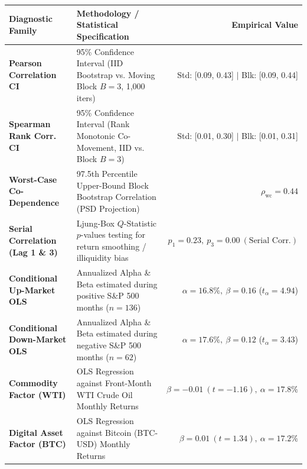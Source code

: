\documentclass[10pt,a4paper]{article}
\begin{document}
\vspace{0.45em}

\begin{tcolorbox}[colback=white, colframe=primary, title=\textbf{\small\strut Appendix A: Extended Statistical, Bootstrap \& Factor Diagnostics}, fonttitle=\sffamily\bfseries\small, arc=5pt, boxrule=0.8pt, toptitle=4pt, bottomtitle=4pt, left=6pt, right=6pt, top=3.5pt, bottom=3.5pt, colbacktitle=primary]
\renewcommand{\arraystretch}{1.22}
\scriptsize
\begin{tabularx}{\textwidth}{l X r}
\toprule
\textbf{\textcolor{primary}{Diagnostic Family}} & \textbf{\textcolor{primary}{Methodology / Statistical Specification}} & \textbf{\textcolor{primary}{Empirical Value}} \\
\midrule
\textbf{Pearson Correlation CI} & 95\% Confidence Interval (IID Bootstrap vs. Moving Block $B=3$, 1,000 iters) & Std: [0.09, 0.43] $\vert$ Blk: [0.09, 0.44] \\
\rowcolor{cardbg} \textbf{Spearman Rank Corr. CI} & 95\% Confidence Interval (Rank Monotonic Co-Movement, IID vs. Block $B=3$) & Std: [0.01, 0.30] $\vert$ Blk: [0.01, 0.31] \\
\textbf{Worst-Case Co-Dependence} & 97.5th Percentile Upper-Bound Block Bootstrap Correlation (PSD Projection) & $\rho_{\text{wc}} = 0.44$ \\
\rowcolor{cardbg} \textbf{Serial Correlation (Lag 1 \& 3)} & Ljung-Box $Q$-Statistic $p$-values testing for return smoothing / illiquidity bias & $p_1=0.23,\ p_3=0.00\ (\text{Serial Corr.})$ \\
\textbf{Conditional Up-Market OLS} & Annualized Alpha \& Beta estimated during positive S\&P 500 months ($n=136$) & $\alpha=16.8\%,\ \beta=0.16$ ($t_\alpha=4.94$) \\
\rowcolor{cardbg} \textbf{Conditional Down-Market OLS} & Annualized Alpha \& Beta estimated during negative S\&P 500 months ($n=62$) & $\alpha=17.6\%,\ \beta=0.12$ ($t_\alpha=3.43$) \\
\textbf{Commodity Factor (WTI)} & OLS Regression against Front-Month WTI Crude Oil Monthly Returns & $\beta=-0.01\ (t=-1.16),\ \alpha=17.8\%$ \\
\rowcolor{cardbg} \textbf{Digital Asset Factor (BTC)} & OLS Regression against Bitcoin (BTC-USD) Monthly Returns & $\beta=0.01\ (t=1.34),\ \alpha=17.2\%$ \\
\bottomrule
\end{tabularx}
\end{tcolorbox}
\end{document}
